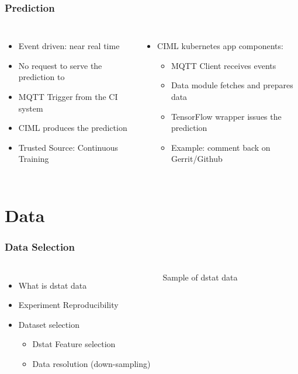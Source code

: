 \documentclass[aspectratio=169,11pt,hyperref={colorlinks=true}]{beamer}
\begin{document}
\begin{frame}
    \frametitle{Prediction}
    \begin{columns}
        \begin{itemize}
            \item{Event driven: near real time}
            \item{No request to serve the prediction to}
            \item{MQTT Trigger from the CI system}
            \item{CIML produces the prediction}
            \item{Trusted Source: Continuous Training}
        \end{itemize}
        \begin{itemize}
          \item{CIML kubernetes app components:}
          \begin{itemize}
            \item{MQTT Client receives events}
            \item{Data module fetches and prepares data}
            \item{TensorFlow wrapper issues the prediction}
            \item{Example: comment back on Gerrit/Github}
          \end{itemize}
        \end{itemize}
    \end{columns}
\end{frame}

\section{Data}
\begin{frame}
    \frametitle{Data Selection}
    \begin{columns}
        \begin{itemize}
            \item{What is dstat data}
            \item{Experiment Reproducibility}
            \item{Dataset selection}
            \begin{itemize}
              \item{Dstat Feature selection}
              \item{Data resolution (down-sampling)}
            \end{itemize}
        \end{itemize}
      \begin{table}[h!]
        \begin{center}
          \caption{Sample of dstat data}
          \label{dstat_sample}
        \end{center}
     \end{table}
  \end{columns}
\end{frame}
\end{document}
